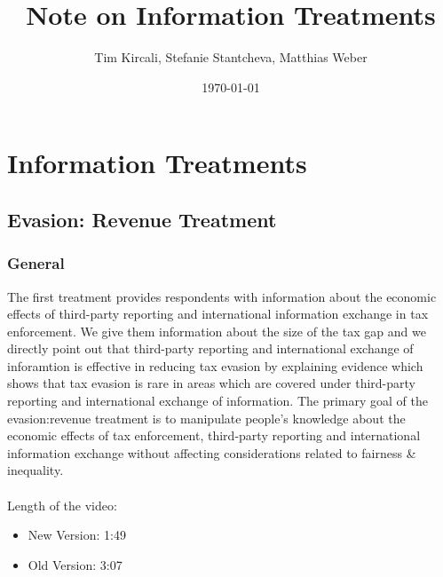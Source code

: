 \documentclass[11pt]{article}
\title{Note on Information Treatments}
\author{Tim Kircali, Stefanie Stantcheva, Matthias Weber}
\date{\today} %
\begin{document}
\maketitle
\section{Information Treatments}
\subsection{Evasion: Revenue Treatment}
\subsubsection*{General}
The first treatment provides respondents with information about the economic effects of third-party reporting and international information exchange in tax enforcement. We give them information about the size of the tax gap and we directly point out that third-party reporting and international exchange of inforamtion is effective in reducing tax evasion by explaining evidence which shows that tax evasion is rare in areas which are covered under third-party reporting and international exchange of information. The primary goal of the evasion:revenue treatment is to manipulate people’s knowledge about the economic effects of tax enforcement, third-party reporting and international information exchange without affecting considerations related to fairness \& inequality. \\ \\
Length of the video: 
\begin{itemize}
    \item New Version: 1:49
    \item Old Version: 3:07
\end{itemize}
\end{document}
